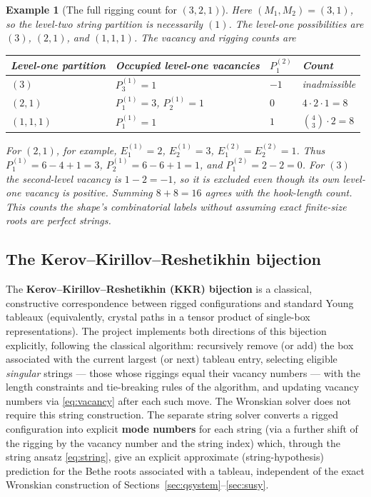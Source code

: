 \documentclass[11pt]{article}
\newtheorem{example}{Example}[section]
\begin{document}
\begin{example}[The full rigging count for $(3,2,1)$]
Here $(M_1,M_2)=(3,1)$, so the level-two string partition is necessarily
$(1)$. The level-one possibilities are $(3)$, $(2,1)$, and $(1,1,1)$.
The vacancy and rigging counts are
\begin{center}
\begin{tabular}{@{}llll@{}}
\toprule
Level-one partition & Occupied level-one vacancies & $P^{(2)}_1$ & Count\\
\midrule
$(3)$ & $P^{(1)}_3=1$ & $-1$ & inadmissible\\
$(2,1)$ & $P^{(1)}_1=3$, $P^{(1)}_2=1$ & $0$ & $4\cdot2\cdot1=8$\\
$(1,1,1)$ & $P^{(1)}_1=1$ & $1$ & $\binom{4}{3}\cdot2=8$\\
\bottomrule
\end{tabular}
\end{center}
For $(2,1)$, for example, $E^{(1)}_1=2$, $E^{(1)}_2=3$,
$E^{(2)}_1=E^{(2)}_2=1$. Thus
$P^{(1)}_1=6-4+1=3$, $P^{(1)}_2=6-6+1=1$, and
$P^{(2)}_1=2-2=0$. For $(3)$ the second-level vacancy is
$1-2=-1$, so it is excluded even though its own level-one vacancy is
positive. Summing $8+8=16$ agrees with the hook-length count.
This counts the shape's combinatorial labels without assuming exact
finite-size roots are perfect strings.
\end{example}

\subsection{The Kerov--Kirillov--Reshetikhin bijection}

The \textbf{Kerov--Kirillov--Reshetikhin (KKR) bijection} is a classical,
constructive correspondence between rigged configurations and standard
Young tableaux (equivalently, crystal paths in a tensor product of
single-box representations). The project implements both directions of
this bijection explicitly, following the classical algorithm: recursively
remove (or add) the box associated with the current largest (or next)
tableau entry, selecting eligible \emph{singular} strings --- those whose riggings
equal their vacancy numbers --- with the length constraints and
tie-breaking rules of the algorithm, and updating vacancy numbers via
\eqref{eq:vacancy} after each such move. The Wronskian solver does not require this string construction.
The separate string solver converts a
rigged configuration into explicit \textbf{mode numbers} for each string
(via a further shift of the rigging by the vacancy number and the string
index) which, through the string ansatz \eqref{eq:string}, give an
explicit approximate (string-hypothesis) prediction for the Bethe roots
associated with a tableau, independent of the exact Wronskian
construction of Sections~\ref{sec:qsystem}--\ref{sec:susy}.
\end{document}
